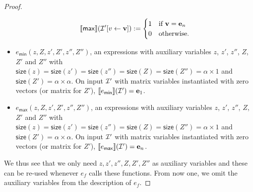 \begin{proof}
\begin{itemize}
        $$\llbracket \mathsf{max} \rrbracket(\mathcal{I}'[v\gets\mathbf{v}]):=\begin{cases} 1 & \text{if $\mathbf{v}=\mathbf{e}_{n}$}\\
            0 & \text{otherwise}.
            \end{cases}$$
        \item $e_{\mathsf{min}}(z,Z,z',Z',z'',Z'')$, an expressions with
        auxiliary variables $z$, $z'$, $z''$, $Z$, $Z'$ and $Z''$ with 
        $\mathsf{size}(z)=\mathsf{size}(z')=\mathsf{size}(z'')=\mathsf{size}(Z)=\mathsf{size}(Z'')=\alpha\times 1$ 
        and $\mathsf{size}(Z')=\alpha\times\alpha$. On input $\mathcal{I}'$ with 
        matrix variables instantiated with zero vectors (or matrix for $Z'$),
        $\llbracket e_{\mathsf{min}} \rrbracket(\mathcal{I}')=\mathbf{e}_1$. 
        \item $e_{\mathsf{max}}(z,Z,z',Z',z'',Z'')$, an expressions with
        auxiliary variables $z$, $z'$, $z''$, $Z$, $Z'$ and $Z''$ with 
        $\mathsf{size}(z)=\mathsf{size}(z')=\mathsf{size}(z'')=\mathsf{size}(Z)=\mathsf{size}(Z'')=\alpha\times 1$ 
        and $\mathsf{size}(Z')=\alpha\times\alpha$. On input $\mathcal{I}'$ with 
        matrix variables instantiated with zero vectors (or matrix for $Z'$),
        $\llbracket e_{\mathsf{max}} \rrbracket(\mathcal{I}')=\mathbf{e}_n$. 	 		
    \end{itemize}
    We thus see that we only need $z,z',z'',Z,Z',Z''$ as auxiliary variables and these can be re-used 
    whenever $e_f$ calls these functions. From now one, we omit the auxiliary variables from the description 
    of $e_f$.



\end{proof}
